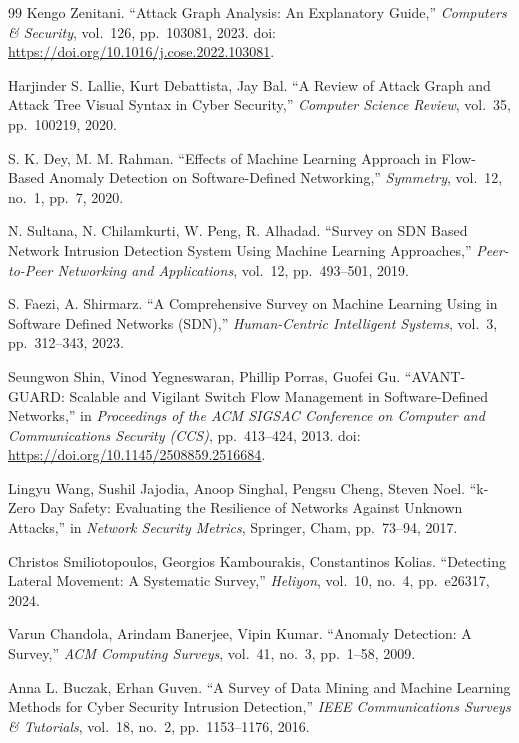 \begin{thebibliography}{99}
 Kengo Zenitani. ``Attack Graph Analysis: An Explanatory Guide,'' \emph{Computers \& Security}, vol.~126, pp.~103081, 2023. doi: \url{https://doi.org/10.1016/j.cose.2022.103081}.

 Harjinder S. Lallie, Kurt Debattista, Jay Bal. ``A Review of Attack Graph and Attack Tree Visual Syntax in Cyber Security,'' \emph{Computer Science Review}, vol.~35, pp.~100219, 2020.

 S. K. Dey, M. M. Rahman. ``Effects of Machine Learning Approach in Flow-Based Anomaly Detection on Software-Defined Networking,'' \emph{Symmetry}, vol.~12, no.~1, pp.~7, 2020.

 N. Sultana, N. Chilamkurti, W. Peng, R. Alhadad. ``Survey on {SDN} Based Network Intrusion Detection System Using Machine Learning Approaches,'' \emph{Peer-to-Peer Networking and Applications}, vol.~12, pp.~493--501, 2019.

 S. Faezi, A. Shirmarz. ``A Comprehensive Survey on Machine Learning Using in Software Defined Networks ({SDN}),'' \emph{Human-Centric Intelligent Systems}, vol.~3, pp.~312--343, 2023.

 Seungwon Shin, Vinod Yegneswaran, Phillip Porras, Guofei Gu. ``{AVANT-GUARD}: Scalable and Vigilant Switch Flow Management in Software-Defined Networks,'' in \emph{Proceedings of the ACM SIGSAC Conference on Computer and Communications Security (CCS)}, pp.~413--424, 2013. doi: \url{https://doi.org/10.1145/2508859.2516684}.

 Lingyu Wang, Sushil Jajodia, Anoop Singhal, Pengsu Cheng, Steven Noel. ``{k-Zero Day Safety}: Evaluating the Resilience of Networks Against Unknown Attacks,'' in \emph{Network Security Metrics}, Springer, Cham, pp.~73--94, 2017.

 Christos Smiliotopoulos, Georgios Kambourakis, Constantinos Kolias. ``Detecting Lateral Movement: A Systematic Survey,'' \emph{Heliyon}, vol.~10, no.~4, pp.~e26317, 2024.

 Varun Chandola, Arindam Banerjee, Vipin Kumar. ``Anomaly Detection: A Survey,'' \emph{ACM Computing Surveys}, vol.~41, no.~3, pp.~1--58, 2009.

 Anna L. Buczak, Erhan Guven. ``A Survey of Data Mining and Machine Learning Methods for Cyber Security Intrusion Detection,'' \emph{IEEE Communications Surveys \& Tutorials}, vol.~18, no.~2, pp.~1153--1176, 2016.


\end{thebibliography}
